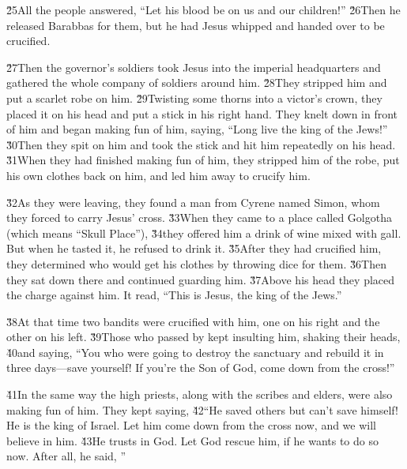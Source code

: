 \v{25}All the people answered, ``Let his blood be on us and our children!'' \v{26}Then he released Barabbas for them, but he had Jesus whipped and handed over to be crucified.

\v{27}Then the governor's soldiers took Jesus into the imperial headquarters and gathered the whole company of soldiers around him. \v{28}They stripped him and put a scarlet robe on him. \v{29}Twisting some thorns into a victor's crown, they placed it on his head and put a stick in his right hand. They knelt down in front of him and began making fun of him, saying, ``Long live the king of the Jews!'' \v{30}Then they spit on him and took the stick and hit him repeatedly on his head. \v{31}When they had finished making fun of him, they stripped him of the robe, put his own clothes back on him, and led him away to crucify him.

\v{32}As they were leaving, they found a man from Cyrene named Simon, whom they forced to carry Jesus' cross. \v{33}When they came to a place called Golgotha (which means ``Skull Place''), \v{34}they offered him a drink of wine mixed with gall. But when he tasted it, he refused to drink it. \v{35}After they had crucified him, they determined who would get his clothes by throwing dice for them. \v{36}Then they sat down there and continued guarding him. \v{37}Above his head they placed the charge against him. It read, ``This is Jesus, the king of the Jews.''

\v{38}At that time two bandits were crucified with him, one on his right and the other on his left. \v{39}Those who passed by kept insulting him, shaking their heads, \v{40}and saying, ``You who were going to destroy the sanctuary and rebuild it in three days---save yourself! If you're the Son of God, come down from the cross!''

\v{41}In the same way the high priests, along with the scribes and elders, were also making fun of him. They kept saying, \v{42}``He saved others but can't save himself! He is the king of Israel. Let him come down from the cross now, and we will believe in him. \v{43}He trusts in God. Let God rescue him, if he wants to do so now. After all, he said, ''

